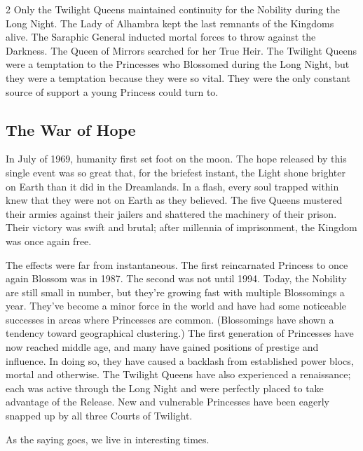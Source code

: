 \begin{multicols}{2}
Only the Twilight Queens maintained continuity for the Nobility during the Long Night. The Lady of Alhambra kept the last remnants of the Kingdoms alive. The Saraphic General inducted mortal forces to throw against the Darkness. The Queen of Mirrors searched for her True Heir. The Twilight Queens were a temptation to the Princesses who Blossomed during the Long Night, but they were a temptation because they were so vital. They were the only constant source of support a young Princess could turn to. 

\subsection*{The War of Hope}%

In July of 1969, humanity first set foot on the moon. The hope released by this single event was so great that, for the briefest instant, the Light shone brighter on Earth than it did in the Dreamlands. In a flash, every soul trapped within knew that they were not on Earth as they believed. The five Queens mustered their armies against their jailers and shattered the machinery of their prison. Their victory was swift and brutal; after millennia of imprisonment, the Kingdom was once again free. 

The effects were far from instantaneous. The first reincarnated Princess to once again Blossom was in 1987. The second was not until 1994. Today, the Nobility are still small in number, but they're growing fast with multiple Blossomings a year. They've become a minor force in the world and have had some noticeable successes in areas where Princesses are common. (Blossomings have shown a tendency toward geographical clustering.) The first generation of Princesses have now reached middle age, and many have gained positions of prestige and influence. In doing so, they have caused a backlash from established power blocs, mortal and otherwise. The Twilight Queens have also experienced a renaissance; each was active through the Long Night and were perfectly placed to take advantage of the Release. New and vulnerable Princesses have been eagerly snapped up by all three Courts of Twilight. 

As the saying goes, we live in interesting times. 


\end{multicols}
